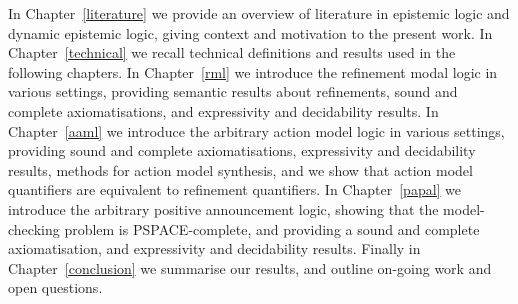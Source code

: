 In Chapter~\ref{literature} we provide an overview of literature in epistemic logic and dynamic epistemic logic, giving context and motivation to the present work.
In Chapter~\ref{technical} we recall technical definitions and results used in the following chapters.
In Chapter~\ref{rml} we introduce the refinement modal logic in various settings, providing semantic results about refinements, sound and complete axiomatisations, and expressivity and decidability results.
In Chapter~\ref{aaml} we introduce the arbitrary action model logic in various settings, providing sound and complete axiomatisations, expressivity and decidability results, methods for action model synthesis, and we show that action model quantifiers are equivalent to refinement quantifiers.
In Chapter~\ref{papal} we introduce the arbitrary positive announcement logic, showing that the model-checking problem is PSPACE-complete, and providing a sound and complete axiomatisation, and expressivity and decidability results.
Finally in Chapter~\ref{conclusion} we summarise our results, and outline on-going work and open questions.

